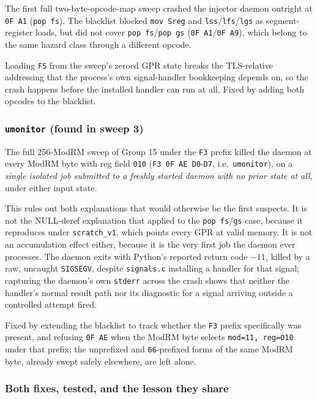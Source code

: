 \documentclass[11pt]{article}
\newcommand{\code}[1]{\texttt{#1}}
\begin{document}
The first full two-byte-opcode-map sweep crashed the injector daemon
outright at \code{0F~A1} (\code{pop~fs}). The blacklist blocked
\code{mov~Sreg} and \code{lss}/\code{lfs}/\code{lgs} as segment-register
loads, but did not cover \code{pop~fs}/\code{pop~gs}
(\code{0F~A1}/\code{0F~A9}), which belong to the same hazard class
through a different opcode.

Loading \code{FS} from the sweep's zeroed GPR state breaks the
TLS-relative addressing that the process's own signal-handler
bookkeeping depends on, so the crash happens before the installed
handler can run at all. Fixed by adding both opcodes to the blacklist.

\subsubsection{\code{umonitor} (found in sweep 3)}

The full 256-ModRM sweep of Group 15 under the \code{F3} prefix killed
the daemon at every ModRM byte with
reg field \code{010} (\code{F3~0F~AE~D0}-\code{D7}, i.e.\
\code{umonitor}), on a \emph{single isolated job submitted to a freshly
started daemon with no prior state at all}, under either input state.

This rules out both explanations that would otherwise be the first
suspects. It is not the NULL-deref explanation that applied to the
\code{pop fs}/\code{gs} case, because it reproduces under
\code{scratch\_v1}, which points every GPR at valid memory. It is not an
accumulation effect either, because it is the very first job the daemon
ever processes. The daemon exits with Python's reported return code
$-11$, killed by a raw, uncaught \code{SIGSEGV}, despite \code{signals.c}
installing a handler for that signal; capturing the daemon's own
\code{stderr} across the crash shows that neither the handler's normal
result path nor its diagnostic for a signal arriving outside a
controlled attempt fired.

Fixed by extending the blacklist to track whether the \code{F3} prefix
specifically was present, and refusing \code{0F AE} when the ModRM byte
selects \code{mod=11, reg=010} under that prefix; the unprefixed and
\code{66}-prefixed forms of the same ModRM byte, already swept safely
elsewhere, are left alone.

\subsubsection{Both fixes, tested, and the lesson they share}
\end{document}
